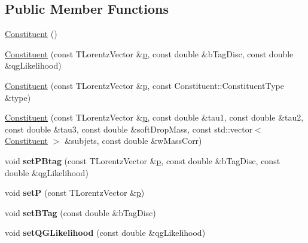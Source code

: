 \subsection*{Public Member Functions}
\begin{DoxyCompactItemize}
\item 
\hyperlink{classConstituent_a70507cdd41d24d156a07bb9409bc95cf}{Constituent} ()
\item 
\hyperlink{classConstituent_a86026ceffb0b81b7f1b306474325789b}{Constituent} (const T\-Lorentz\-Vector \&\hyperlink{classConstituent_a3f918f1210cc666288327544e32d728c}{p}, const double \&b\-Tag\-Disc, const double \&qg\-Likelihood)
\item 
\hyperlink{classConstituent_aed3114a0fd1fdbd1d19ff1117ca9388e}{Constituent} (const T\-Lorentz\-Vector \&\hyperlink{classConstituent_a3f918f1210cc666288327544e32d728c}{p}, const Constituent\-::\-Constituent\-Type \&type)
\item 
\hyperlink{classConstituent_aea65c8ccaa87cd41431adeabdd667c7b}{Constituent} (const T\-Lorentz\-Vector \&\hyperlink{classConstituent_a3f918f1210cc666288327544e32d728c}{p}, const double \&tau1, const double \&tau2, const double \&tau3, const double \&soft\-Drop\-Mass, const std\-::vector$<$ \hyperlink{classConstituent}{Constituent} $>$ \&subjets, const double \&w\-Mass\-Corr)
\item 
\hypertarget{classConstituent_a5282e40233ba506ee9a1e8a5c423ecd3}{void {\bfseries set\-P\-Btag} (const T\-Lorentz\-Vector \&\hyperlink{classConstituent_a3f918f1210cc666288327544e32d728c}{p}, const double \&b\-Tag\-Disc, const double \&qg\-Likelihood)}\label{classConstituent_a5282e40233ba506ee9a1e8a5c423ecd3}

\item 
\hypertarget{classConstituent_a047ea32763c043302815face1f3aef35}{void {\bfseries set\-P} (const T\-Lorentz\-Vector \&\hyperlink{classConstituent_a3f918f1210cc666288327544e32d728c}{p})}\label{classConstituent_a047ea32763c043302815face1f3aef35}

\item 
\hypertarget{classConstituent_ad3e78cbae563a423c7d31aa5d9ca4a30}{void {\bfseries set\-B\-Tag} (const double \&b\-Tag\-Disc)}\label{classConstituent_ad3e78cbae563a423c7d31aa5d9ca4a30}

\item 
\hypertarget{classConstituent_a8d08fcf43d1d33d4a09854b3a180499b}{void {\bfseries set\-Q\-G\-Likelihood} (const double \&qg\-Likelihood)}\label{classConstituent_a8d08fcf43d1d33d4a09854b3a180499b}


\end{DoxyCompactItemize}
